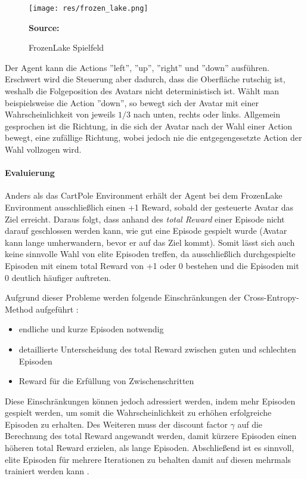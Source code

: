 \documentclass[11pt]{scrartcl}
\newcommand{\source}[1]{\vspace{-5pt} \caption*{\hfill \textbf{Source:} {#1}} }
\begin{document}
\begin{figure}[htp]
\centering
\texttt{[image: res/frozen\_lake.png]}
\caption{FrozenLake Spielfeld}
\source{\cite[~S.90 - Chapter 4 - Figure 5]{L2018}}
\label{fig:frozen_lake}
\end{figure}

\noindent
Der Agent kann die Actions ''left'', ''up'', ''right'' und ''down'' ausführen.
Erschwert wird die Steuerung aber dadurch, dass die Oberfläche rutschig ist, weshalb
die Folgeposition des Avatars nicht deterministisch ist. Wählt man beispielsweise die
Action ''down'', so bewegt sich der Avatar mit einer Wahrscheinlichkeit von jeweils
$1/3$ nach unten, rechts oder links. Allgemein gesprochen ist die Richtung, in die
sich der Avatar nach der Wahl einer Action bewegt, eine zufällige Richtung, wobei
jedoch nie die entgegengesetzte Action der Wahl vollzogen wird.


\paragraph*{Evaluierung}
\label{sec:cross_entropy_results}
\noindent
\newline
Anders als das CartPole Environment erhält der Agent bei dem FrozenLake Environment 
ausschließlich einen +1 Reward, sobald der gesteuerte Avatar das Ziel erreicht. Daraus folgt,
dass anhand des \textit{total Reward} einer Episode nicht darauf geschlossen werden kann,
wie gut eine Episode gespielt wurde (Avatar kann lange umherwandern, bevor er auf das Ziel kommt).
Somit lässt sich auch keine sinnvolle Wahl von elite Episoden treffen, da ausschließlich
durchgespielte Episoden mit einem total Reward von +1 oder 0 bestehen und die Episoden mit 0
deutlich häufiger auftreten.

Aufgrund dieser Probleme werden folgende Einschränkungen der Cross-Entropy-Method 
aufgeführt \cite[~S.92 f.]{L2018}:
\begin{itemize}
\itemsep0pt
\item endliche und kurze Episoden notwendig
\item detaillierte Unterscheidung des total Reward zwischen guten und schlechten Episoden
\item Reward für die Erfüllung von Zwischenschritten
  \label{itm:cross_entropy_limits}
\end{itemize}

Diese Einschränkungen können jedoch adressiert werden, indem mehr Episoden gespielt werden,
um somit die Wahrscheinlichkeit zu erhöhen erfolgreiche Episoden zu erhalten. Des Weiteren
muss der discount factor $\gamma$ auf die Berechnung des total Reward angewandt werden, damit
kürzere Episoden einen höheren total Reward erzielen, als lange Episoden. Abschließend ist es
sinnvoll, elite Episoden für mehrere Iterationen zu behalten damit auf diesen mehrmals
trainiert werden kann \cite[~S.93]{L2018}.  
\end{document}
